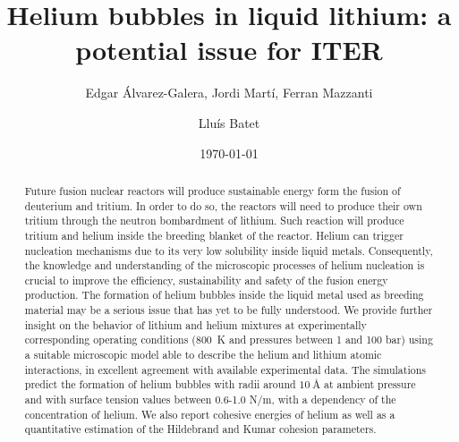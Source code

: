 \documentclass[jcp,amsmath,amssymb,preprint]{revtex4-1}
\begin{document}
\preprint{}

\title{Helium bubbles in liquid lithium: a potential issue for ITER}%

\author{Edgar Álvarez-Galera, Jordi Martí, Ferran Mazzanti}%
\author{Lluís Batet}

\date{\today}%

\begin{abstract}
{Future fusion nuclear reactors will produce sustainable energy form the fusion of deuterium and tritium.  In order to do so, the reactors will need to produce their own tritium through the neutron bombardment of lithium.  Such reaction will produce tritium and helium inside the breeding blanket of the reactor.  Helium can trigger nucleation mechanisms due to its very low solubility inside liquid metals.  Consequently,  the knowledge and understanding of the microscopic processes of helium nucleation is crucial to improve the efficiency,  sustainability and safety of the fusion energy production.  The formation of helium bubbles inside the liquid metal used as breeding material may be a serious issue that has yet to be fully understood.  We provide further insight on the behavior of lithium and helium mixtures at experimentally corresponding operating conditions (800~K and pressures between 1 and 100 bar) using a suitable microscopic model able to describe the helium and lithium atomic interactions, in excellent agreement with available experimental data. The simulations predict the formation of helium bubbles with radii around $\SI{10}{\angstrom}$ at ambient pressure and with surface tension values between 0.6-1.0 N/m,  with a 
dependency of the concentration of helium.  We also report cohesive energies of helium as well as a quantitative estimation of the Hildebrand and Kumar cohesion parameters. } 
\end{abstract}
\end{document}
